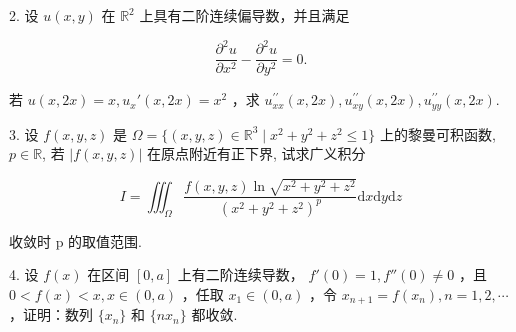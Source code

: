 \documentclass{examcollection}
\renewcommand{\displayformula}[1]{\[#1\]}
\begin{document}
{\begin{minipage}{\textwidth}
2. 设 $u(x, y)$ 在 $\mathbb{R}^2$ 上具有二阶连续偏导数，并且满足\par
\displayformula{\frac {\partial^ {2} u}{\partial x ^ {2}} - \frac {\partial^ {2} u}{\partial y ^ {2}} = 0.}\par
若 $u(x,2x) = x,u_x'(x,2x) = x^2$ ，求 $u_{xx}^{\prime \prime}(x,2x),u_{xy}^{\prime \prime}(x,2x),u_{yy}^{\prime \prime}(x,2x).$\par
3. 设 $f(x, y, z)$ 是 $\Omega = \{(x, y, z) \in \mathbb{R}^3 \mid x^2 + y^2 + z^2 \leq 1\}$ 上的黎曼可积函数, $p \in \mathbb{R}$, 若 $|f(x, y, z)|$ 在原点附近有正下界, 试求广义积分\par
\displayformula{I = \iiint_ {\Omega} \frac {f (x , y , z) \ln \sqrt {x ^ {2} + y ^ {2} + z ^ {2}}}{(x ^ {2} + y ^ {2} + z ^ {2}) ^ {p}} \mathrm{d} x \mathrm{d} y \mathrm{d} z}\par
收敛时 p 的取值范围.\par
4. 设  $f(x)$  在区间  $[0, a]$  上有二阶连续导数， $f'(0) = 1, f''(0) \neq 0$ ，且  $0 < f(x) < x, x \in (0, a)$ ，任取  $x_{1} \in (0, a)$ ，令  $x_{n+1} = f(x_{n}), n = 1, 2, \cdots$ ，证明：数列  $\{x_{n}\}$  和  $\{nx_{n}\}$  都收敛.\par
\end{minipage}}
\ifdim\dimexpr\ht\proofbox+\dp\proofbox\relax>\textheight
\noindent\resizebox{!}{\textheight}{\usebox{\proofbox}}\else\noindent\usebox{\proofbox}\fi\clearpage
\end{document}

